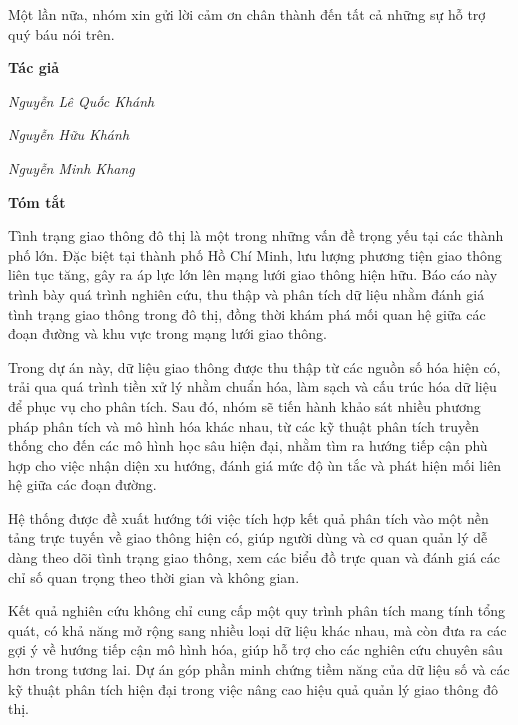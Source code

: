 \documentclass[12pt, a4paper]{article}
\theoremstyle{definition}
\begin{document}
Một lần nữa, nhóm xin gửi lời cảm ơn chân thành đến tất cả những sự hỗ trợ quý báu nói trên.

\par\hfill\textbf{Tác giả}\hspace{1cm}
\par\hfill\textit{Nguyễn Lê Quốc Khánh}
\par\hfill\textit{Nguyễn Hữu Khánh}\hspace{0.3cm}
\par\hfill\textit{Nguyễn Minh Khang}\hspace{0.2cm}
\newpage

\begin{center}
    \textbf{\Large Tóm tắt}
\end{center}
\quad
Tình trạng giao thông đô thị là một trong những vấn đề trọng yếu tại các thành phố lớn. Đặc biệt tại thành phố Hồ Chí Minh, lưu lượng phương tiện giao thông liên tục tăng, gây ra áp lực lớn lên mạng lưới giao thông hiện hữu. Báo cáo này trình bày quá trình nghiên cứu, thu thập và phân tích dữ liệu nhằm đánh giá tình trạng giao thông trong đô thị, đồng thời khám phá mối quan hệ giữa các đoạn đường và khu vực trong mạng lưới giao thông.

Trong dự án này, dữ liệu giao thông được thu thập từ các nguồn số hóa hiện có, trải qua quá trình tiền xử lý nhằm chuẩn hóa, làm sạch và cấu trúc hóa dữ liệu để phục vụ cho phân tích. Sau đó, nhóm sẽ tiến hành khảo sát nhiều phương pháp phân tích và mô hình hóa khác nhau, từ các kỹ thuật phân tích truyền thống cho đến các mô hình học sâu hiện đại, nhằm tìm ra hướng tiếp cận phù hợp cho việc nhận diện xu hướng, đánh giá mức độ ùn tắc và phát hiện mối liên hệ giữa các đoạn đường.

Hệ thống được đề xuất hướng tới việc tích hợp kết quả phân tích vào một nền tảng trực tuyến về giao thông hiện có, giúp người dùng và cơ quan quản lý dễ dàng theo dõi tình trạng giao thông, xem các biểu đồ trực quan và đánh giá các chỉ số quan trọng theo thời gian và không gian.

Kết quả nghiên cứu không chỉ cung cấp một quy trình phân tích mang tính tổng quát, có khả năng mở rộng sang nhiều loại dữ liệu khác nhau, mà còn đưa ra các gợi ý về hướng tiếp cận mô hình hóa, giúp hỗ trợ cho các nghiên cứu chuyên sâu hơn trong tương lai. Dự án góp phần minh chứng tiềm năng của dữ liệu số và các kỹ thuật phân tích hiện đại trong việc nâng cao hiệu quả quản lý giao thông đô thị.
\newpage
\newpage
\tableofcontents
\newpage
\listoffigures
\newpage
\listoftables
\newpage
\setcounter{page}{1}


\newpage


\newpage

\newpage

\newpage

\newpage

\newpage
% 
% 

\newpage

\newpage

\newpage

\end{document}
